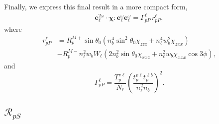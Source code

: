 \documentclass{article}
\begin{document}
Finally, we express this final result in a more compact form,
\begin{equation}
\begin{split}
\mathbf{e}^{2\omega}_{\ell}\cdot\boldsymbol{\chi}:
\mathbf{e}^{\omega}_{\ell}\mathbf{e}^{\omega}_{\ell} =
\Gamma^{\ell}_{pP}\,r^{\ell}_{pP},
\end{split}
\end{equation}
where
\begin{equation}
\begin{split}
r^{\ell}_{pP} &= 
R^{M+}_{p}\sin\theta_{0}(n^{4}_{b}\sin^{2}\theta_{0}\chi_{zzz} 
+ n^{4}_{\ell}w^{2}_{b}\chi_{zxx})\\
&- R^{M-}_{p}n^{2}_{\ell}w_{b}W_{\ell}(2n^{2}_{b}\sin\theta_{0}\chi_{xxz}
+ n^{2}_{\ell}w_{b}\chi_{xxx}\cos3\phi),
\end{split}
\end{equation}
and
\begin{equation}
\Gamma^{\ell}_{pP} = 
\frac{T^{v\ell}_{p}}{N_{\ell}}
\left(\frac{t^{v\ell}_{p}t^{\ell b}_{p}}{n^{2}_{\ell}n_{b}}\right)^{2}.
\end{equation}


\subsection{\texorpdfstring{$\mathcal{R}_{pS}$}{RpS}}\label{sec:RpS}
\end{document}
